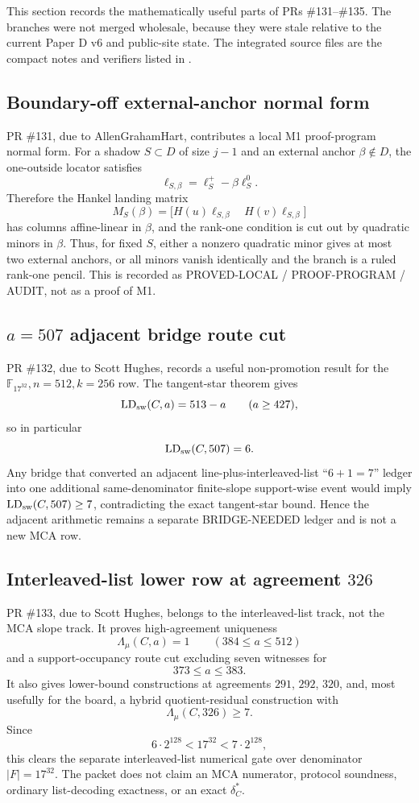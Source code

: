 \documentclass[11pt]{article}
\newcommand{\F}{\mathbb F}
\begin{document}
This section records the mathematically useful parts of PRs \#131--\#135.  The
branches were not merged wholesale, because they were stale relative to the
current Paper D v6 and public-site state.  The integrated source files are the
compact notes and verifiers listed in
.

\subsection{Boundary-off external-anchor normal form}

PR \#131, due to AllenGrahamHart, contributes a local M1 proof-program normal
form.  For a shadow \(S\subset D\) of size \(j-1\) and an external anchor
\(\beta\notin D\), the one-outside locator satisfies
\[
  \ell_{S,\beta}=\ell_S^+-\beta\ell_S^0 .
\]
Therefore the Hankel landing matrix
\[
  M_S(\beta)=
  \bigl[H(u)\ell_{S,\beta}\quad H(v)\ell_{S,\beta}\bigr]
\]
has columns affine-linear in \(\beta\), and the rank-one condition is cut out
by quadratic minors in \(\beta\).  Thus, for fixed \(S\), either a nonzero
quadratic minor gives at most two external anchors, or all minors vanish
identically and the branch is a ruled rank-one pencil.  This is recorded as
PROVED-LOCAL / PROOF-PROGRAM / AUDIT, not as a proof of M1.

\subsection{\(a=507\) adjacent bridge route cut}

PR \#132, due to Scott Hughes, records a useful non-promotion result for the
\(\F_{17^{32}},n=512,k=256\) row.  The tangent-star theorem gives
\[
  \operatorname{LD}_{\rm sw}(C,a)=513-a
  \qquad (a\ge427),
\]
so in particular
\[
  \operatorname{LD}_{\rm sw}(C,507)=6.
\]
Any bridge that converted an adjacent line-plus-interleaved-list
``\(6+1=7\)'' ledger into one additional same-denominator finite-slope
support-wise event would imply
\(\operatorname{LD}_{\rm sw}(C,507)\ge7\), contradicting the exact
tangent-star bound.  Hence the adjacent arithmetic remains a separate
BRIDGE-NEEDED ledger and is not a new MCA row.

\subsection{Interleaved-list lower row at agreement \(326\)}

PR \#133, due to Scott Hughes, belongs to the interleaved-list track, not the
MCA slope track.  It proves high-agreement uniqueness
\[
  \Lambda_\mu(C,a)=1\qquad (384\le a\le512)
\]
and a support-occupancy route cut excluding seven witnesses for
\[
  373\le a\le383.
\]
It also gives lower-bound constructions at agreements \(291\), \(292\), \(320\),
and, most usefully for the board, a hybrid quotient-residual construction with
\[
  \Lambda_\mu(C,326)\ge7 .
\]
Since
\[
  6\cdot2^{128}<17^{32}<7\cdot2^{128},
\]
this clears the separate interleaved-list numerical gate over denominator
\(|F|=17^{32}\).  The packet does not claim an MCA numerator, protocol
soundness, ordinary list-decoding exactness, or an exact \(\delta_C^*\).
\end{document}
